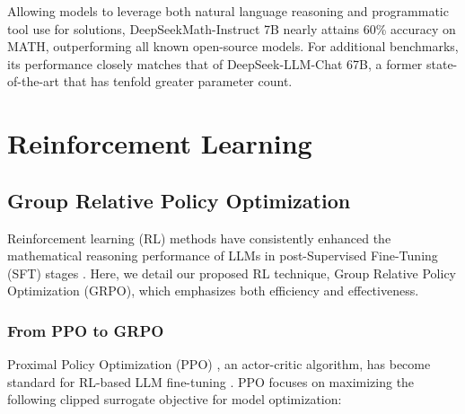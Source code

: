 Allowing models to leverage both natural language reasoning and programmatic tool use for solutions, DeepSeekMath-Instruct 7B nearly attains 60\% accuracy on MATH, outperforming all known open-source models. For additional benchmarks, its performance closely matches that of DeepSeek-LLM-Chat 67B, a former state-of-the-art that has tenfold greater parameter count.

\section{Reinforcement Learning}

\subsection{Group Relative Policy Optimization} Reinforcement learning (RL) methods have consistently enhanced the mathematical reasoning performance of LLMs in post-Supervised Fine-Tuning (SFT) stages \citep{wang2023math,wizardmath}. Here, we detail our proposed RL technique, Group Relative Policy Optimization (GRPO), which emphasizes both efficiency and effectiveness.

\subsubsection{From PPO to GRPO} Proximal Policy Optimization (PPO) \citep{schulman2017proximal}, an actor-critic algorithm, has become standard for RL-based LLM fine-tuning \citep{ouyang2022training}. PPO focuses on maximizing the following clipped surrogate objective for model optimization:

